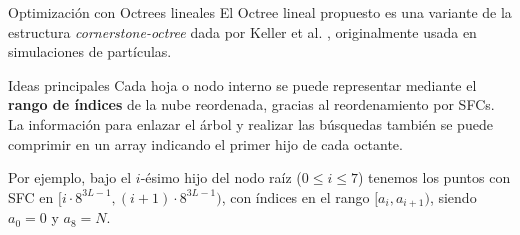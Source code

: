 \documentclass[aspectratio=169]{beamer}
\begin{document}
\begin{frame}{Optimización con Octrees lineales}
        El Octree lineal propuesto es una variante de la estructura \textit{cornerstone-octree} dada por Keller et al. \cite{Keller2023}, originalmente usada en simulaciones de partículas.
        \vspace{1em}
        \begin{block}{Ideas principales}
            \textrightarrow \: Cada hoja o nodo interno se puede representar mediante el \textbf{rango de índices} de la nube reordenada, gracias al reordenamiento por SFCs. \\
            \textrightarrow \: La información para enlazar el árbol y realizar las búsquedas también se puede comprimir en un array indicando el primer hijo de cada octante.
        \end{block} 

        \textbullet\: Por ejemplo, bajo el $i$-ésimo hijo del nodo raíz ($0 \leq i \leq 7$) tenemos los puntos con SFC en $[i\cdot 8^{3L-1}, (i+1) \cdot 8^{3L-1})$, con índices en el rango $[a_i, a_{i+1})$, siendo $a_0 = 0$ y $a_8 = N$.
\end{frame}
\end{document}
